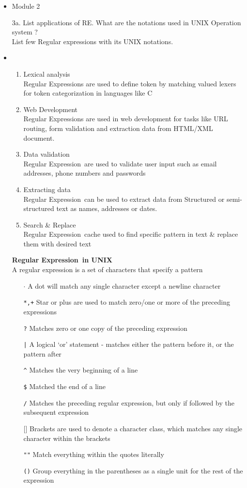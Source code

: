 \documentclass{article}
\newcommand{\module}[1]{
	 
	\item[] \phantomsection \begin{center} {\LARGE Module #1} \end{center}
	\addcontentsline{toc}{section}{Module #1}
}
\def \answer{\item [$\rightarrow$]}
\def \REGEX{Regular Expression}
\begin{document}
\begin{itemize}
		\module{2}
		\item[3a.] List applications of RE.
			What are the notations used in UNIX Operation system ? \\
			List few Regular expressions with its UNIX notations.
		\answer
			\begin{enumerate}
				\item Lexical analysis \\
					\REGEX s are used to define token by matching valued lexers for token
					categorization in languages like C
				\item Web Development \\
					\REGEX s are used in web development for tasks like URL routing, form validation and
					extraction data from HTML/XML document.
				\item Data validation \\
					\REGEX~are used to validate user input such as email addresses, phone numbers and passwords
				\item Extracting data \\
					\REGEX~can be used to extract data from Structured or semi-structured text as names,
					addresses or dates.
				\item Search \& Replace \\
					\REGEX~cache used to find specific pattern in text \& replace them with desired text
			\end{enumerate}
		\textbf{\REGEX~in UNIX} \\
		A regular expression is a set of characters that specify a pattern
		\begin{itemize}[itemindent=1em]
			\item [\texttt{$\cdot$}] A dot will match any single character except a newline character
			\item [\texttt{*,+}] Star or plus are used to match zero/one or more of the preceding expressions
			\item [\texttt{?}] Matches zero or one copy of the preceding expression
			\item [\texttt{|}] A logical `or' statement - matches either the pattern before it, or the pattern
				after
			\item [\texttt{\textasciicircum}] Matches the very beginning of a line
			\item [\texttt{\$}] Matched the end of a line
			\item [\texttt{/}] Matches the preceding regular expression, but only if followed by the subsequent
				expression
			\item [$\texttt{[]}$] Brackets are used to denote a character class, which matches any single
				character within the brackets
			\item [\texttt{""}] Match everything within the quotes literally
			\item [\texttt{()}] Group everything in the parentheses as a single unit for the rest of the
				expression
		\end{itemize}
		\newpage


\end{itemize}
\end{document}
